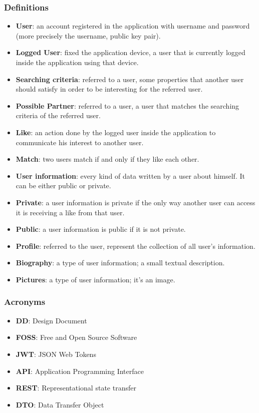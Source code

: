 \documentclass{article}
\begin{document}
\subsubsection{Definitions}
\begin{itemize}
\item \textbf{User}: an account registered in the application with username and password (more precisely the username, public key pair).
\item \textbf{Logged User}: fixed the application device, a user that is currently logged inside the application using that device.
\item \textbf{Searching criteria}: referred to a user, some properties that another user should satisfy in order to be interesting for the referred user.
\item \textbf{Possible Partner}: referred to a user, a user that matches the searching criteria of the referred user.
\item \textbf{Like}: an action done by the logged user inside the application to communicate his interest to another user.
\item \textbf{Match}: two users match if and only if they like each other.
\item \textbf{User information}: every kind of data written by a user about himself. It can be either public or private.
\item \textbf{Private}: a user information is private if the only way another user can access it is receiving a like from that user.
\item \textbf{Public}: a user information is public if it is not private.
\item \textbf{Profile}: referred to the user, represent the collection of all user's information.
\item \textbf{Biography}: a type of user information; a small textual description.
\item \textbf{Pictures}: a type of user information; it's an image.

\end{itemize}

\subsubsection{Acronyms}
\begin{itemize}
	\item \textbf{DD}: Design Document
	\item \textbf{FOSS}: Free and Open Source Software
	\item \textbf{JWT}: JSON Web Tokens
	\item \textbf{API}: Application Programming Interface
	\item \textbf{REST}: Representational state transfer
	\item \textbf{DTO}: Data Transfer Object
\end{itemize}
\end{document}
